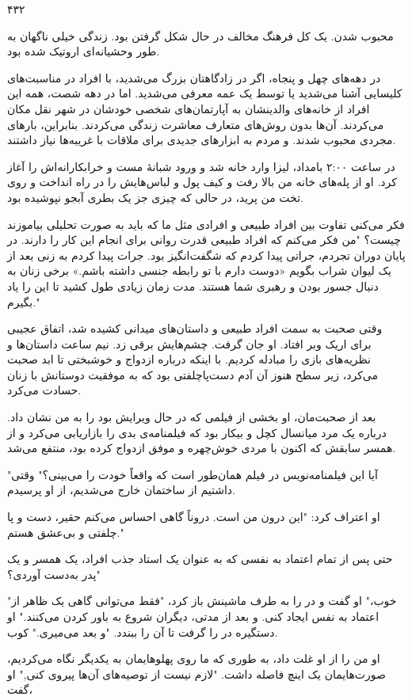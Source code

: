 ۴۳۲ 

محبوب شدن. یک کل فرهنگ مخالف در حال شکل گرفتن بود. زندگی خیلی ناگهان به طور وحشیانه‌ای اروتیک شده بود. 

در دهه‌های چهل و پنجاه، اگر در زادگاهتان بزرگ می‌شدید، با افراد در مناسبت‌های کلیسایی آشنا می‌شدید یا توسط یک عمه معرفی می‌شدید. اما در دهه شصت، همه این افراد از خانه‌های والدینشان به آپارتمان‌های شخصی خودشان در شهر نقل مکان می‌کردند. آن‌ها بدون روش‌های متعارف معاشرت زندگی می‌کردند. بنابراین، بارهای مجردی محبوب شدند. و مردم به ابزارهای جدیدی برای ملاقات با غریبه‌ها نیاز داشتند. 

در ساعت ۲:۰۰ بامداد، لیزا وارد خانه شد و ورود شبانهٔ مست و خرابکارانه‌اش را آغاز کرد. او از پله‌های خانه من بالا رفت و کیف پول و لباس‌هایش را در راه انداخت و روی تخت من پرید، در حالی که چیزی جز یک بطری آبجو نپوشیده بود. 

فکر می‌کنی تفاوت بین افراد طبیعی و افرادی مثل ما که باید به صورت تحلیلی بیاموزند چیست؟ "من فکر می‌کنم که افراد طبیعی قدرت روانی برای انجام این کار را دارند. در پایان دوران تجردم، جراتی پیدا کردم که شگفت‌انگیز بود. جرات پیدا کردم به زنی بعد از یک لیوان شراب بگویم «دوست دارم با تو رابطه جنسی داشته باشم.» برخی زنان به دنبال جسور بودن و رهبری شما هستند. مدت زمان زیادی طول کشید تا این را یاد بگیرم."

وقتی صحبت به سمت افراد طبیعی و داستان‌های میدانی کشیده شد، اتفاق عجیبی برای اریک وبر افتاد. او جان گرفت. چشم‌هایش برقی زد. نیم ساعت داستان‌ها و نظریه‌های بازی را مبادله کردیم. با اینکه درباره ازدواج و خوشبختی تا ابد صحبت می‌کرد، زیر سطح هنوز آن آدم دست‌پاچلفتی بود که به موفقیت دوستانش با زنان حسادت می‌کرد.

بعد از صحبت‌مان، او بخشی از فیلمی که در حال ویرایش بود را به من نشان داد. درباره یک مرد میانسال کچل و بیکار بود که فیلمنامه‌ی بدی را بازاریابی می‌کرد و از همسر سابقش که اکنون با مردی خوش‌چهره و موفق ازدواج کرده بود، منتفع می‌شد.

"آیا این فیلمنامه‌نویس در فیلم همان‌طور است که واقعاً خودت را می‌بینی؟" وقتی داشتیم از ساختمان خارج می‌شدیم، از او پرسیدم. 

او اعتراف کرد: "این درون من است. دروناً گاهی احساس می‌کنم حقیر، دست و پا چلفتی و بی‌عشق هستم."

حتی پس از تمام اعتماد به نفسی که به عنوان یک استاد جذب افراد، یک همسر و یک پدر به‌دست آوردی؟"

"خوب،" او گفت و در را به طرف ماشینش باز کرد، "فقط می‌توانی گاهی یک ظاهر از اعتماد به نفس ایجاد کنی. و بعد از مدتی، دیگران شروع به باور کردن می‌کنند." او دستگیره در را گرفت تا آن را ببندد. "و بعد می‌میری." کوب.

او من را از او غلت داد، به طوری که ما روی پهلوهایمان به یکدیگر نگاه می‌کردیم، صورت‌هایمان یک اینچ فاصله داشت. "لازم نیست از توصیه‌های آن‌ها پیروی کنی," او گفت،